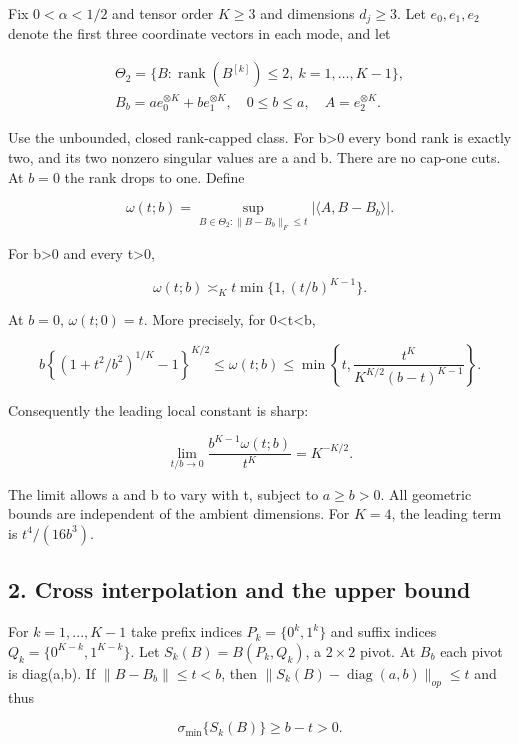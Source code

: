 \documentclass[
  11pt,
]{article}
\begin{document}
Fix \(0<\alpha <1/2\) and tensor order \(K\ge 3\) and dimensions
\(d_j\ge 3\). Let \(e_0,e_1,e_2\) denote the first three coordinate
vectors in each mode, and let

\[
 \begin{gathered}
 \Theta_2=\{B:\operatorname{rank}(B^{[k]})\le2,
                   \ k=1,\ldots,K-1\},\\
 B_b=a e_0^{\otimes K}+b e_1^{\otimes K},\quad0\le b\le a,
 \quad A=e_2^{\otimes K}.
\end{gathered}
\]

Use the unbounded, closed rank-capped class. For b\textgreater0 every
bond rank is exactly two, and its two nonzero singular values are a and
b. There are no cap-one cuts. At \(b=0\) the rank drops to one. Define

\[
 \omega(t;b)=\sup_{B\in\Theta_2:\|B-B_b\|_F\le t}
                  |\langle A,B-B_b\rangle|.
\]

For b\textgreater0 and every t\textgreater0,

\[
 \omega(t;b)\asymp_K
       t\min\{1,(t/b)^{K-1}\}. \tag{T1}
\]

At \(b=0\), \(\omega (t;0)=t\). More precisely, for
0\textless t\textless b,

\[
 b\left\{(1+t^2/b^2)^{1/K}-1\right\}^{K/2}
 \le\omega(t;b)\le
 \min\left\{t,\frac{t^K}{K^{K/2}(b-t)^{K-1}}\right\}. \tag{T2}
\]

Consequently the leading local constant is sharp:

\[
 \lim_{t/b\to0}\frac{b^{K-1}\omega(t;b)}{t^K}
       =K^{-K/2}. \tag{T3}
\]

The limit allows a and b to vary with t, subject to \(a\ge b>0\). All
geometric bounds are independent of the ambient dimensions. For \(K=4\),
the leading term is \(t^{4}/(16b^{3})\).

\subsection{2. Cross interpolation and the upper
bound}\label{cross-interpolation-and-the-upper-bound}

For \(k=1,...,K-1\) take prefix indices \(P_k=\{0^k,1^k\}\) and suffix
indices \(Q_k=\{0^{K-k},1^{K-k}\}\). Let \(S_k(B)=B(P_k,Q_k)\), a
\(2\times 2\) pivot. At \(B_b\) each pivot is diag(a,b). If
\(\|B-B_b\|\le t<b\), then
\(\|S_k(B)-\operatorname{diag}(a,b)\|_{op}\le t\) and thus

\[
 \sigma_{\min}\{S_k(B)\}\ge b-t>0.
\]
\end{document}
